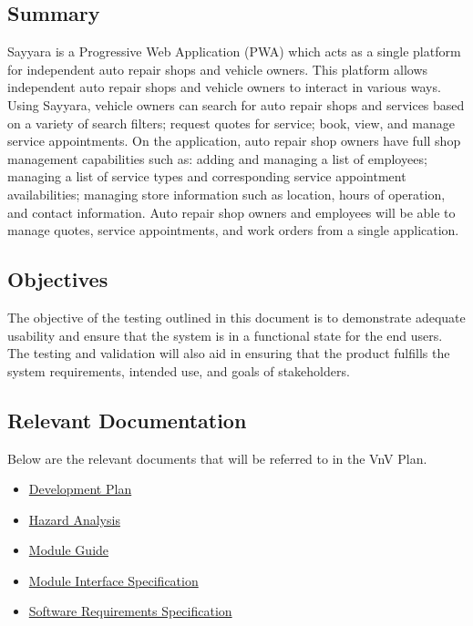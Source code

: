 \documentclass[12pt, titlepage]{article}
\begin{document}
\subsection{Summary}

Sayyara is a Progressive Web Application (PWA) which acts as a single platform for independent auto
repair shops and vehicle owners. This platform allows independent auto repair shops and vehicle
owners to interact in various ways. Using Sayyara, vehicle owners can search for auto repair shops
and services based on a variety of search filters; request quotes for service; book, view, and
manage service appointments. On the application, auto repair shop owners have full shop management
capabilities such as: adding and managing a list of employees; managing a list of service types and
corresponding service appointment availabilities; managing store information such as location,
hours of operation, and contact information. Auto repair shop owners and employees will be able to
manage quotes, service appointments, and work orders from a single application.

\subsection{Objectives}

The objective of the testing outlined in this document is to demonstrate adequate usability and
ensure that the system is in a functional state for the end users. The testing and validation will
also aid in ensuring that the product fulfills the system requirements, intended use, and goals of
stakeholders.

\subsection{Relevant Documentation}

Below are the relevant documents that will be referred to in the VnV Plan.

\begin{itemize}
	\item \href{https://github.com/arkinmodi/project-sayyara/blob/main/docs/DevelopmentPlan/DevelopmentPlan.pdf}{Development Plan \citep*{DevPlan}}
	\item \href{https://github.com/arkinmodi/project-sayyara/blob/main/docs/HazardAnalysis/HazardAnalysis.pdf}{Hazard Analysis \citep*{HA}}
	\item \href{https://github.com/arkinmodi/project-sayyara/blob/main/docs/Design/SoftArchitecture/MG.pdf}{Module Guide \citep*{MG}}
	\item \href{https://github.com/arkinmodi/project-sayyara/blob/main/docs/Design/SoftDetailedDes/MIS.pdf}{Module Interface Specification \citep*{MIS}}
	\item \href{https://github.com/arkinmodi/project-sayyara/blob/main/docs/SRS/SRS.pdf}{Software Requirements Specification \citep*{SRS}}
\end{itemize}
\end{document}
